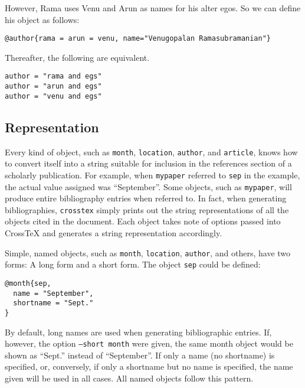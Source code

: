 \documentclass{article}
\begin{document}
However, Rama uses Venu and Arun as names for his alter egos. So we can define his object as follows:

\begin{small}\begin{verbatim}
@author{rama = arun = venu, name="Venugopalan Ramasubramanian"}
\end{verbatim}\end{small}

Thereafter, the following are equivalent.

\begin{small}\begin{verbatim}
author = "rama and egs"
author = "arun and egs"
author = "venu and egs"
\end{verbatim}\end{small}

\subsection{Representation}

Every kind of object, such as \texttt{month}, \texttt{location}, \texttt{author}, and \texttt{article}, knows how to convert itself into a string suitable for inclusion in the references section of a scholarly publication. For example, when \texttt{mypaper} referred to \texttt{sep} in the example, the actual value assigned was ``September''. Some objects, such as \texttt{mypaper}, will produce entire bibliography entries when referred to. In fact, when generating bibliographies, \texttt{crosstex} simply prints out the string representations of all the objects cited in the document.  Each object takes note of options passed into CrossTeX and generates a string representation accordingly.

Simple, named objects, such as \texttt{month}, \texttt{location}, \texttt{author}, and others, have two forms: A long form and a short form. The object \texttt{sep} could be defined:

\begin{small}\begin{verbatim}
@month{sep,
  name = "September",
  shortname = "Sept."
}
\end{verbatim}\end{small}

By default, long names are used when generating bibliographic entries. If, however, the option \texttt{--short month} were given, the same month object would be shown as ``Sept.'' instead of ``September''. If only a name (no shortname) is specified, or, conversely, if only a shortname but no name is specified, the name given will be used in all cases. All named objects follow this pattern.
\end{document}
